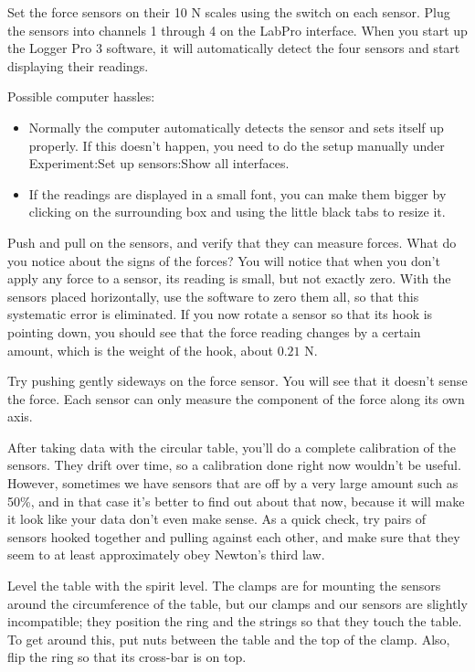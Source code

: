 Set the force sensors on their 10 N scales using the switch on each
sensor.
Plug the sensors into channels 1 through 4 on the LabPro interface.
When you start up the Logger Pro 3 software, it will automatically detect
the four sensors and start displaying their readings. 


Possible computer hassles:
\begin{itemize}
\item[] Normally the computer automatically detects the sensor and sets itself up
properly. If this doesn't happen, you need to do the setup manually under
Experiment:Set up sensors:Show all interfaces.
\item[] If the readings are displayed in a small font, you can make them bigger
by clicking on the surrounding box and using the little black tabs to resize it.
\end{itemize}

Push and pull on the sensors, and verify that they can measure forces.
What do you notice about the signs of the forces?
You will notice that when you don't apply any force to a sensor, its reading
is small, but not exactly zero.
With the sensors placed horizontally, use the software to zero them all, so that
this systematic error is eliminated. If you now rotate a sensor so that its hook
is pointing down, you should see that the force reading changes by a certain amount,
which is the weight of the hook, about $0.21$ N.

Try pushing gently sideways on the force sensor. You will see that it doesn't
sense the force.
Each sensor can only measure the component of the force along its
own axis.

After taking data with the circular table, you'll do a complete calibration of the
sensors. They drift over time, so a calibration done right now wouldn't be useful.
However, sometimes we have sensors that are off by a very large
amount such as 50\%, and in that case it's better to find out about that now, because
it will make it look like your data don't even make sense. As a quick check, try
pairs of sensors hooked together and pulling against each other, and make sure that
they seem to at least approximately obey Newton's third law.

Level the table with the spirit level. The clamps are for mounting the sensors around
the circumference of the table, but our clamps and our sensors are slightly incompatible;
they position the ring and the strings so that they touch the table. To get around this, put
nuts between the table and the top of the clamp. Also, flip the ring so that its
cross-bar is on top.


